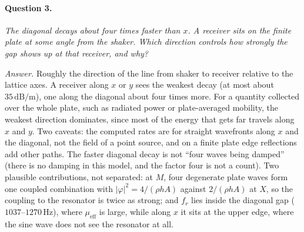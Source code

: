 \paragraph{Question 3.} \emph{The diagonal decays about four times faster than $x$. A
receiver sits on the finite plate at some angle from the shaker. Which direction
controls how strongly the gap shows up at that receiver, and why?}

\emph{Answer.} Roughly the direction of the line from shaker to receiver relative to
the lattice axes. A receiver along $x$ or $y$ sees the weakest decay (at most about
$35\,\mathrm{dB/m}$), one along the diagonal about four times more. For a quantity
collected over the whole plate, such as radiated power or plate-averaged mobility, the
weakest direction dominates, since most of the energy that gets far travels along $x$
and $y$. Two caveats: the computed rates are for straight wavefronts along $x$ and the
diagonal, not the field of a point source, and on a finite plate edge reflections add
other paths. The faster diagonal decay is not ``four waves being damped'' (there is no
damping in this model, and the factor four is not a count). Two plausible contributions,
not separated: at $M$, four degenerate plate waves form one coupled combination with
$|\varphi|^2 = 4/(\rho h A)$ against $2/(\rho h A)$ at $X$, so the coupling to the
resonator is twice as strong; and $f_r$ lies inside the diagonal gap
($1037$--$1270\,\mathrm{Hz}$), where $\mu_\mathrm{eff}$ is large, while along $x$ it sits
at the upper edge, where the sine wave does not see the resonator at all.
